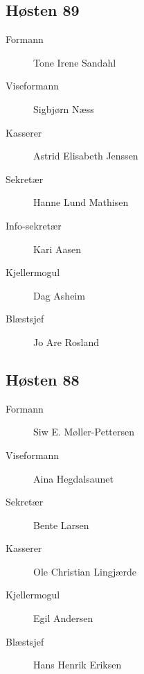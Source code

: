 {\begin{minipage}{0.6\textwidth}
\subsection*{Høsten 89}

\begin{description}
	\item[Formann] Tone Irene Sandahl
	\item[Viseformann] Sigbjørn Næss
	\item[Kasserer] Astrid Elisabeth Jenssen
	\item[Sekretær] Hanne Lund Mathisen
	\item[Info-sekretær] Kari Aasen
	\item[Kjellermogul] Dag Asheim
	\item[Blæstsjef] Jo Are Rosland
\end{description}
\subsection*{Høsten 88}

\begin{description}
	\item[Formann]  Siw E. Møller-Pettersen
	\item[Viseformann] Aina Hegdalsaunet
	\item[Sekretær] Bente Larsen
	\item[Kasserer] Ole Christian Lingjærde
	\item[Kjellermogul] Egil Andersen
	\item[Blæstsjef] Hans Henrik Eriksen
\end{description}
\end{minipage}
}


